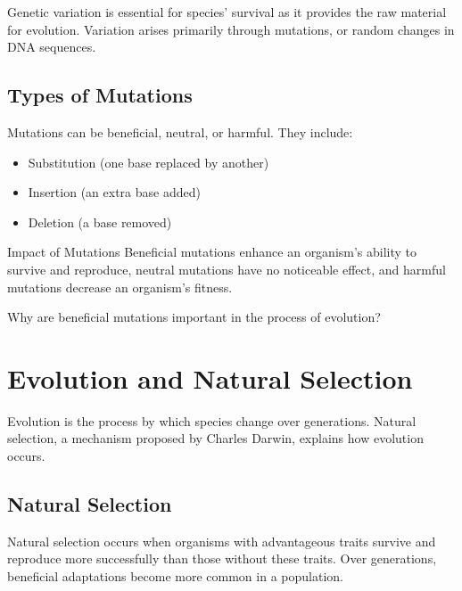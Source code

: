 Genetic variation is essential for species' survival as it provides the raw material for evolution. Variation arises primarily through mutations, or random changes in DNA sequences.

\subsection{Types of Mutations}

Mutations can be beneficial, neutral, or harmful. They include:
\begin{itemize}
    \item Substitution (one base replaced by another)
    \item Insertion (an extra base added)
    \item Deletion (a base removed)
\end{itemize}

\begin{keyconcept}{Impact of Mutations}
Beneficial mutations enhance an organism's ability to survive and reproduce, neutral mutations have no noticeable effect, and harmful mutations decrease an organism's fitness.
\end{keyconcept}

\begin{stopandthink}
Why are beneficial mutations important in the process of evolution?
\end{stopandthink}

\section{Evolution and Natural Selection}

Evolution is the process by which species change over generations. Natural selection, a mechanism proposed by Charles Darwin, explains how evolution occurs.


\subsection{Natural Selection}

Natural selection occurs when organisms with advantageous traits survive and reproduce more successfully than those without these traits. Over generations, beneficial adaptations become more common in a population.

